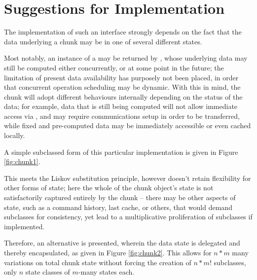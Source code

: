\documentclass[10pt, a4paper]{article}
\begin{document}
\section{Suggestions for Implementation}

The implementation of such an interface strongly depends on the fact that the data underlying a chunk may be in one of several different states. 

Most notably, an instance of a  may be returned by , whose underlying data may still be computed either concurrently, or at some point in the future; the limitation of present data availability has purposely not been placed, in order that concurrent operation scheduling may be dynamic.
With this in mind, the chunk will adopt different behaviours internally depending on the status of the data; for example, data that is still being computed will not allow immediate access via , and may require communications setup in order to be transferred, while fixed and pre-computed data may be immediately accessible or even cached locally.

A simple subclassed form of this particular implementation is given in Figure \ref{fig:chunk1}.


This meets the Liskov substitution principle\cite{liskov1988lsp}, however doesn't retain flexibility for other forms of state; here the whole of the chunk object's state is not satisfactorily captured entirely by the chunk -- there may be other aspects of state, such as a command history, last cache, or others, that would demand subclasses for consistency, yet lead to a multiplicative proliferation of subclasses if implemented.

Therefore, an alternative is presented, wherein the data state is delegated and thereby encapsulated, as given in Figure \ref{fig:chunk2}. This allows for $n*m$ many variations on total chunk state without forcing the creation of $n*m!$ subclasses, only $n$ state classes of $m$-many states each.

\end{document}
